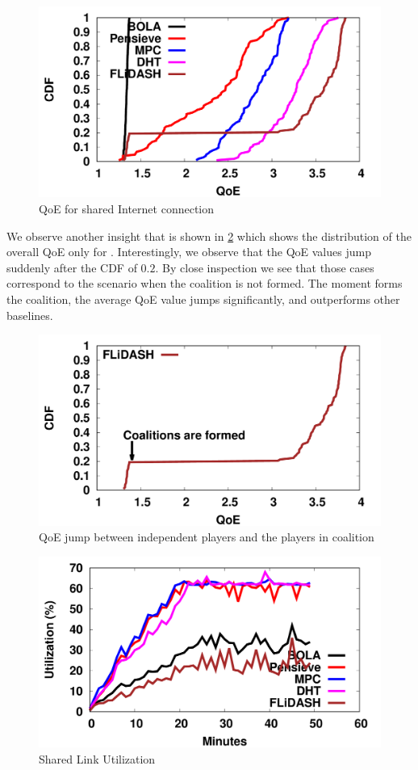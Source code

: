 \begin{figure}[!ht]
	\centering
	\includegraphics[width=0.75\linewidth]{img/sharedlink/qoe_cdf_1}
	\caption{QoE for shared Internet connection}
	\label{fig:chap06:shrd_qoe}
\end{figure}

We observe another insight that is shown in \fig\ref{fig:chap06:shrd_qoe_flsd} which shows the distribution of the overall \ac{QoE} only for \our. Interestingly, we observe that the \ac{QoE} values jump suddenly after the \ac{CDF} of $0.2$. By close inspection we see that those cases correspond to the scenario when the coalition is not formed. The moment {\our} forms the coalition, the average \ac{QoE} value jumps significantly, and {\our} outperforms other baselines.

\begin{figure}[!ht]
	\centering
	\includegraphics[width=0.75\linewidth]{img/sharedlink/qoe_cdf_flsd}
	\caption{\acs{QoE} jump between independent players and the players in coalition}
	\label{fig:chap06:shrd_qoe_flsd}
\end{figure}


\begin{figure}[!ht]
	\centering
	\includegraphics[width=0.75\linewidth]{img/sharedlink/corenetwork_1}
	\caption{Shared Link Utilization}
	\label{fig:chap06:shrd_link_util}
\end{figure}

